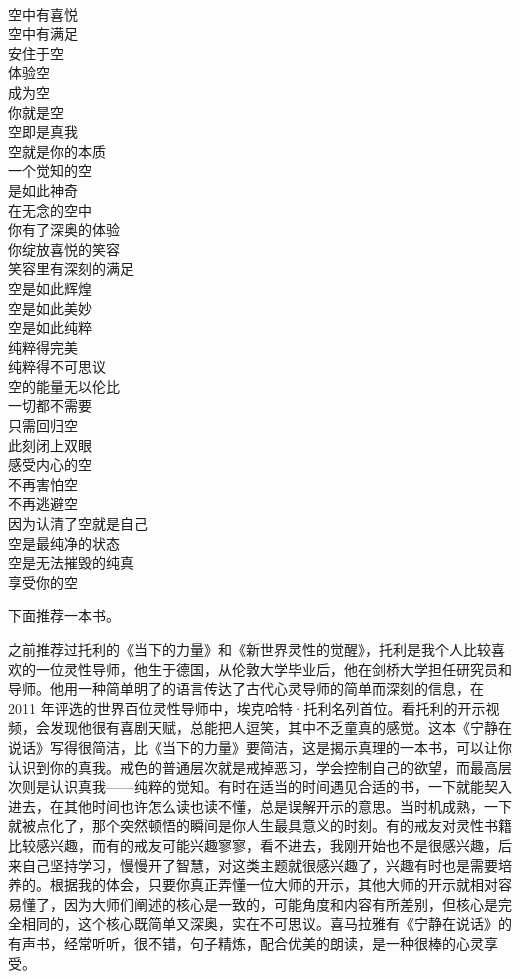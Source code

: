 \begin{poem}[空的纯粹]
    \begin{multicols}{4}
        \centering~\\
        空中有喜悦 \\ 空中有满足 \\ 安住于空 \\ 体验空 \\ 成为空 \\ 你就是空 \\ 空即是真我 \\ 空就是你的本质 \\ 一个觉知的空 \\ 是如此神奇 \\ 在无念的空中 \\ 你有了深奥的体验 \\ 你绽放喜悦的笑容 \\ 笑容里有深刻的满足 \\ 空是如此辉煌 \\ 空是如此美妙 \\ 空是如此纯粹 \\ 纯粹得完美 \\ 纯粹得不可思议 \\ 空的能量无以伦比 \\ 一切都不需要 \\ 只需回归空 \\ 此刻闭上双眼 \\ 感受内心的空 \\ 不再害怕空 \\ 不再逃避空 \\ 因为认清了空就是自己 \\ 空是最纯净的状态 \\ 空是无法摧毁的纯真 \\ 享受你的空
    \end{multicols}
\end{poem}

下面推荐一本书。

\begin{book}
    之前推荐过托利的《当下的力量》和《新世界灵性的觉醒》，托利是我个人比较喜欢的一位灵性导师，他生于德国，从伦敦大学毕业后，他在剑桥大学担任研究员和导师。他用一种简单明了的语言传达了古代心灵导师的简单而深刻的信息，在 2011 年评选的世界百位灵性导师中，埃克哈特·托利名列首位。看托利的开示视频，会发现他很有喜剧天赋，总能把人逗笑，其中不乏童真的感觉。这本《宁静在说话》写得很简洁，比《当下的力量》要简洁，这是揭示真理的一本书，可以让你认识到你的真我。戒色的普通层次就是戒掉恶习，学会控制自己的欲望，而最高层次则是认识真我——纯粹的觉知。有时在适当的时间遇见合适的书，一下就能契入进去，在其他时间也许怎么读也读不懂，总是误解开示的意思。当时机成熟，一下就被点化了，那个突然顿悟的瞬间是你人生最具意义的时刻。有的戒友对灵性书籍比较感兴趣，而有的戒友可能兴趣寥寥，看不进去，我刚开始也不是很感兴趣，后来自己坚持学习，慢慢开了智慧，对这类主题就很感兴趣了，兴趣有时也是需要培养的。根据我的体会，只要你真正弄懂一位大师的开示，其他大师的开示就相对容易懂了，因为大师们阐述的核心是一致的，可能角度和内容有所差别，但核心是完全相同的，这个核心既简单又深奥，实在不可思议。喜马拉雅有《宁静在说话》的有声书，经常听听，很不错，句子精炼，配合优美的朗读，是一种很棒的心灵享受。
\end{book}
